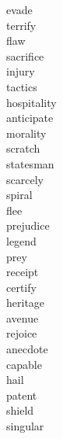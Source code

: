 \documentclass[a4paper, 10pt]{ctexart}
\begin{document}
\begin{multicols*}{2}
\begin{description}
\item[evade]

\item[terrify]

\item[flaw]

\item[sacrifice]

\item[injury]

\item[tactics]

\item[hospitality]

\item[anticipate]

\item[morality]

\item[scratch]

\item[statesman]

\item[scarcely]

\item[spiral]

\item[flee]

\item[prejudice]

\item[legend]

\item[prey]

\item[receipt]

\item[certify]

\item[heritage]

\item[avenue]

\item[rejoice]

\item[anecdote]

\item[capable]

\item[hail]

\item[patent]

\item[shield]

\item[singular]


\end{description}
\end{multicols*}
\end{document}
